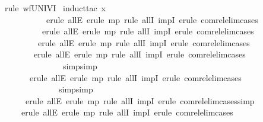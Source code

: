 \begin{isabellebody}
%
\isadelimproof
%
\endisadelimproof
%
\isatagproof
{}\isamarkupfalse%
\ {\isacharparenleft}rule\ wfUNIVI{\isacharparenright}\isanewline
{}\isamarkupfalse%
\ {\isacharparenleft}induct{\isacharunderscore}tac\ x{\isacharparenright}\isanewline
{}\isamarkupfalse%
\ \ \ \ \ \ \ \ \ \ \ {\isacharparenleft}erule\ allE{\isacharcomma}\ erule\ mp{\isacharcomma}\ {\isacharparenleft}rule\ allI\ impI{\isacharparenright}{\isacharplus}{\isacharcomma}\ erule\ com{\isacharunderscore}rel{\isacharunderscore}elim{\isacharunderscore}cases{\isacharparenright}\isanewline
{}\isamarkupfalse%
\ \ \ \ \ \ \ \ \ \ {\isacharparenleft}erule\ allE{\isacharcomma}\ erule\ mp{\isacharcomma}\ {\isacharparenleft}rule\ allI\ impI{\isacharparenright}{\isacharplus}{\isacharcomma}\ erule\ com{\isacharunderscore}rel{\isacharunderscore}elim{\isacharunderscore}cases{\isacharparenright}\isanewline
{}\isamarkupfalse%
\ \ \ \ \ \ \ \ \ {\isacharparenleft}erule\ allE{\isacharcomma}\ erule\ mp{\isacharcomma}\ {\isacharparenleft}rule\ allI\ impI{\isacharparenright}{\isacharplus}{\isacharcomma}\ erule\ com{\isacharunderscore}rel{\isacharunderscore}elim{\isacharunderscore}cases{\isacharparenright}\isanewline
{}\isamarkupfalse%
\ \ \ \ \ \ \ \ {\isacharparenleft}erule\ allE{\isacharcomma}\ erule\ mp{\isacharcomma}\ {\isacharparenleft}rule\ allI\ impI{\isacharparenright}{\isacharplus}{\isacharcomma}\ erule\ com{\isacharunderscore}rel{\isacharunderscore}elim{\isacharunderscore}cases{\isacharcomma}\isanewline
\ \ \ \ \ \ \ \ \ \ \ \ \ \ \ simp{\isacharcomma}simp{\isacharparenright}\isanewline
{}\isamarkupfalse%
\ \ \ \ \ \ \ {\isacharparenleft}erule\ allE{\isacharcomma}\ erule\ mp{\isacharcomma}\ {\isacharparenleft}rule\ allI\ impI{\isacharparenright}{\isacharplus}{\isacharcomma}\ erule\ com{\isacharunderscore}rel{\isacharunderscore}elim{\isacharunderscore}cases{\isacharcomma}\isanewline
\ \ \ \ \ \ \ \ \ \ \ \ \ \ simp{\isacharcomma}simp{\isacharparenright}\isanewline
{}\isamarkupfalse%
\ \ \ \ \ \ {\isacharparenleft}erule\ allE{\isacharcomma}\ erule\ mp{\isacharcomma}\ {\isacharparenleft}rule\ allI\ impI{\isacharparenright}{\isacharplus}{\isacharcomma}\ erule\ com{\isacharunderscore}rel{\isacharunderscore}elim{\isacharunderscore}cases{\isacharcomma}simp{\isacharparenright}\isanewline
{}\isamarkupfalse%
\ \ \ \ \ {\isacharparenleft}erule\ allE{\isacharcomma}\ erule\ mp{\isacharcomma}\ {\isacharparenleft}rule\ allI\ impI{\isacharparenright}{\isacharplus}{\isacharcomma}\ erule\ com{\isacharunderscore}rel{\isacharunderscore}elim{\isacharunderscore}cases{\isacharparenright}\isanewline

\end{isabellebody}
